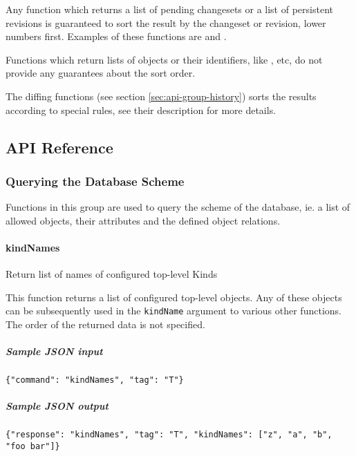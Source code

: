 \documentclass{article}
\begin{document}
Any function which returns a list of pending changesets or a list of persistent revisions is guaranteed to sort the
result by the changeset or revision, lower numbers first.  Examples of these functions are 
and .

Functions which return lists of objects or their identifiers, like ,
 etc, do not provide any guarantees about the sort order.

The diffing functions (see section \ref{sec:api-group-history}) sorts the results according to special rules, see their
description for more details.

\subsection{API Reference}

\newcommand{\deskaFunc}[5]
{\paragraph{#1}\label{sec:api-ref-#1}

{#4}

{#5}

\subparagraph{Sample JSON input} {\tt \{"command": "{#1}", "tag": "T"{#2}\}}

\subparagraph{Sample JSON output} {\tt \{"response": "{#1}", "tag": "T"\ifstrequal{#3}{}{}{, "{#1}": {#3}}\}}

}

\newcommand{\deskaUnsortedRes}{The order of the returned data is not specified.}

\setcounter{secnumdepth}{4}

\subsubsection{Querying the Database Scheme}
\label{sec:api-group-dbscheme}

Functions in this group are used to query the scheme of the database, ie. a list of allowed objects, their attributes
and the defined object relations.

\deskaFunc{kindNames}{}{["z", "a", "b", "foo bar"]}
    {Return list of names of configured top-level Kinds}
    {This function returns a list of configured top-level objects.  Any of these objects can be subsequently used in the
    {\tt kindName} argument to various other functions.  \deskaUnsortedRes}
\end{document}
